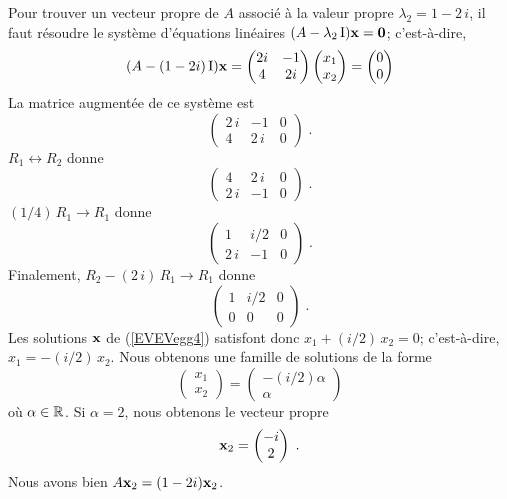 {\begin{egg}
Pour trouver un vecteur propre de $A$ associé à la valeur propre
$\lambda_2=1-2\,i$, il faut résoudre le système d'équations linéaires
$(A -\lambda_2 \operatorname{I}) \mathbf{x} = \mathbf{0}$; c'est-à-dire,
\begin{equation}\label{EVEVegg4}
(A - (1 - 2 i)\operatorname{I})\mathbf{x} =
\begin{pmatrix}
2i & -1 \\ 4 & 2i  
\end{pmatrix}
\begin{pmatrix}
x_1 \\ x_2
\end{pmatrix}
=
\begin{pmatrix}
0 \\ 0
\end{pmatrix}
\end{equation}
La matrice augmentée de ce système est
\[
\left(\begin{array}{rr|r}
2\,i & -1 & 0 \\
4 & 2\,i  & 0
\end{array}\right) \; .
\]
$R_1 \leftrightarrow R_2$ donne
\[
\left(\begin{array}{rr|r}
4 & 2\,i  & 0 \\
2\,i & -1 & 0
\end{array}\right) \; .
\]
$(1/4)\,R_1 \to R_1$ donne
\[
\left(\begin{array}{rr|r}
1 & i/2  & 0 \\
2\,i & -1 & 0
\end{array}\right) \; .
\]
Finalement, $R_2 - (2\,i)\,R_1 \to R_1$ donne
\[
\left(\begin{array}{rr|r}
1 & i/2  & 0 \\
0 & 0 & 0
\end{array}\right) \; .
\]
Les solutions $\mathbf{x}$ de (\ref{EVEVegg4}) satisfont donc
$x_1 +(i/2)\,x_2 = 0$; c'est-à-dire, $x_1= -(i/2)\,x_2$.  Nous obtenons
une famille de solutions de la forme
\[
\begin{pmatrix}
x_1 \\ x_2
\end{pmatrix}
=
\begin{pmatrix}
-(i/2)\alpha \\ \alpha
\end{pmatrix}
\]
où $\alpha \in \mathbb{R}$.  Si $\alpha = 2$, nous obtenons le vecteur propre
\[
\mathbf{x}_2 =
\begin{pmatrix}
-i \\ 2
\end{pmatrix} \; .
\]
Nous avons bien $A\mathbf{x}_2 = (1- 2 i) \mathbf{x}_2$.
\end{egg}

}
